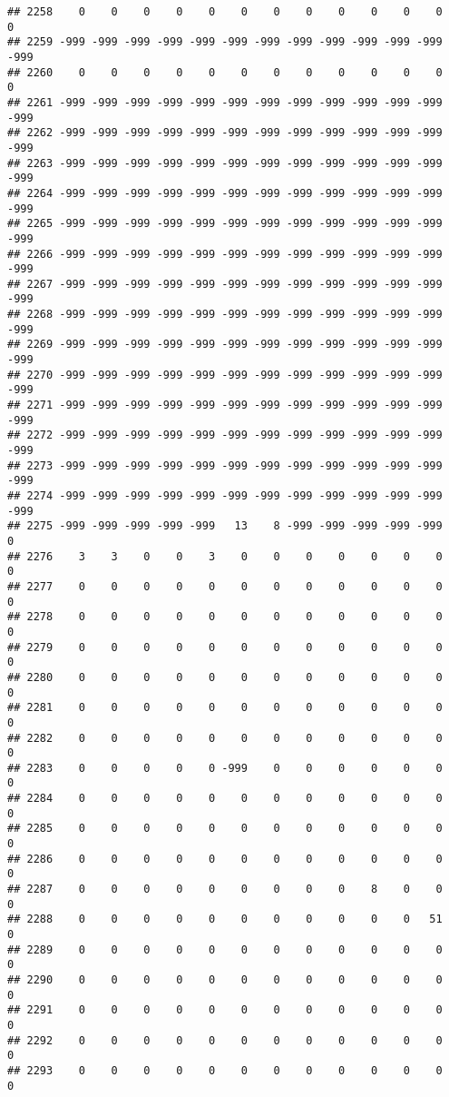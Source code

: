 \documentclass[]{article}
\begin{document}
\begin{verbatim}
## 2258    0    0    0    0    0    0    0    0    0    0    0    0    0
## 2259 -999 -999 -999 -999 -999 -999 -999 -999 -999 -999 -999 -999 -999
## 2260    0    0    0    0    0    0    0    0    0    0    0    0    0
## 2261 -999 -999 -999 -999 -999 -999 -999 -999 -999 -999 -999 -999 -999
## 2262 -999 -999 -999 -999 -999 -999 -999 -999 -999 -999 -999 -999 -999
## 2263 -999 -999 -999 -999 -999 -999 -999 -999 -999 -999 -999 -999 -999
## 2264 -999 -999 -999 -999 -999 -999 -999 -999 -999 -999 -999 -999 -999
## 2265 -999 -999 -999 -999 -999 -999 -999 -999 -999 -999 -999 -999 -999
## 2266 -999 -999 -999 -999 -999 -999 -999 -999 -999 -999 -999 -999 -999
## 2267 -999 -999 -999 -999 -999 -999 -999 -999 -999 -999 -999 -999 -999
## 2268 -999 -999 -999 -999 -999 -999 -999 -999 -999 -999 -999 -999 -999
## 2269 -999 -999 -999 -999 -999 -999 -999 -999 -999 -999 -999 -999 -999
## 2270 -999 -999 -999 -999 -999 -999 -999 -999 -999 -999 -999 -999 -999
## 2271 -999 -999 -999 -999 -999 -999 -999 -999 -999 -999 -999 -999 -999
## 2272 -999 -999 -999 -999 -999 -999 -999 -999 -999 -999 -999 -999 -999
## 2273 -999 -999 -999 -999 -999 -999 -999 -999 -999 -999 -999 -999 -999
## 2274 -999 -999 -999 -999 -999 -999 -999 -999 -999 -999 -999 -999 -999
## 2275 -999 -999 -999 -999 -999   13    8 -999 -999 -999 -999 -999    0
## 2276    3    3    0    0    3    0    0    0    0    0    0    0    0
## 2277    0    0    0    0    0    0    0    0    0    0    0    0    0
## 2278    0    0    0    0    0    0    0    0    0    0    0    0    0
## 2279    0    0    0    0    0    0    0    0    0    0    0    0    0
## 2280    0    0    0    0    0    0    0    0    0    0    0    0    0
## 2281    0    0    0    0    0    0    0    0    0    0    0    0    0
## 2282    0    0    0    0    0    0    0    0    0    0    0    0    0
## 2283    0    0    0    0    0 -999    0    0    0    0    0    0    0
## 2284    0    0    0    0    0    0    0    0    0    0    0    0    0
## 2285    0    0    0    0    0    0    0    0    0    0    0    0    0
## 2286    0    0    0    0    0    0    0    0    0    0    0    0    0
## 2287    0    0    0    0    0    0    0    0    0    8    0    0    0
## 2288    0    0    0    0    0    0    0    0    0    0    0   51    0
## 2289    0    0    0    0    0    0    0    0    0    0    0    0    0
## 2290    0    0    0    0    0    0    0    0    0    0    0    0    0
## 2291    0    0    0    0    0    0    0    0    0    0    0    0    0
## 2292    0    0    0    0    0    0    0    0    0    0    0    0    0
## 2293    0    0    0    0    0    0    0    0    0    0    0    0    0

\end{verbatim}
\end{document}
